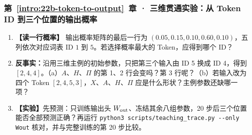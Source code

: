 \subsubsection*{第~\ref*{intro:22b-token-to-output}~章 · 三维贯通实验：从 Token ID 到三个位置的输出概率}
\begin{enumerate}[label={},leftmargin=4.8em,itemsep=4pt]
\item[\textbf{C-072.}] \leavevmode{}\label{exercise:C-072}\label{exercise:probability-row-greedy}\textbf{【读一行概率】} 输出概率矩阵的最后一行为 $(0.05,0.15,0.10,0.60,0.10)$，五列依次对应词表 ID $1$ 到 $5$。若选择概率最大的 Token，应得到哪个 ID？
\item[\textbf{C-073.}] \leavevmode{}\label{exercise:C-073}\label{exercise:causal-input-change}\textbf{反事实：}沿用三维主例的初始参数，只把第三个输入由 ID 5 换成 ID 4，得到 $[2,4,4]$。（a）$A$、$H$、$\Pi$ 的第 1、2 行会变吗？第 3 行呢？（b）若输入改为四个 Token $[2,4,5,3]$，$X$、$A$、$H$、$\Pi$ 应是什么形状？主例参数还缺哪一项？
\item[\textbf{C-074.}] \leavevmode{}\label{exercise:C-074}\label{exercise:output-head-only-training}\textbf{【实验】}先预测：只训练输出头 $W_{\rm out}$、冻结其余八组参数，20 步后三个位置能否全部预测正确？再运行 \texttt{python3 scripts/teaching\_trace.py -{}-only Wout} 核对，并与完整训练的第 20 步比较。
\end{enumerate}
